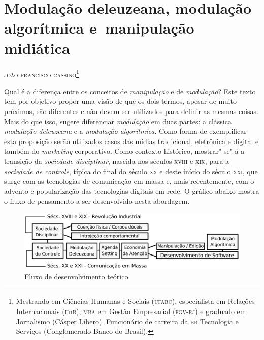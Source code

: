 \chapter{Modulação deleuzeana, modulação algorítmica e~manipulação midiática}

\begin{flushright}
\textsc{joão francisco cassino\footnote{Mestrando em Ciências Humanas e Sociais (\textsc{ufabc}), especialista em Relações Internacionais (\textsc{u}n\textsc{b}), \textsc{mba} em Gestão Empresarial (\textsc{fgv-rj}) e graduado em Jornalismo (Cásper Líbero). Funcionário de carreira da \textsc{bb} Tecnologia e Serviços (Conglomerado Banco do Brasil).}}
\end{flushright}

\setlength{\epigraphwidth}{.60\textwidth}
\begin{epigraphs} 

\end{epigraphs} 

\noindent{}Qual é a diferença entre os conceitos de \emph{manipulação} e de
\emph{modulação}? Este texto tem por objetivo propor uma visão de que os
dois termos, apesar de muito próximos, são diferentes e não devem ser
utilizados para definir as mesmas coisas. Mais do que isso, sugere
diferenciar \emph{modulação} em duas partes: a clássica \emph{modulação
deleuzeana} e a \emph{modulação algorítmica}. Como forma de exemplificar
esta proposição serão utilizados casos das mídias tradicional,
eletrônica e digital e também do \emph{marketing} corporativo. Como
contexto histórico, mostrar"-se"-á a transição da \emph{sociedade
disciplinar}, nascida nos séculos \textsc{xviii} e \textsc{xix}, para a \emph{sociedade de
controle}, típica do final do século \textsc{xx} e deste início do século \textsc{xxi},
que surge com as tecnologias de comunicação em massa e, mais
recentemente, com o advento e popularização das tecnologias digitais em
rede. O gráfico abaixo mostra o fluxo de pensamento a ser desenvolvido nesta
abordagem.

\begin{figure}[!ht]
\includegraphics[width=\textwidth]{./imgs/grafico1.png}
\caption{\formular\footnotesize{Fluxo de desenvolvimento teórico.}}
\end{figure}

